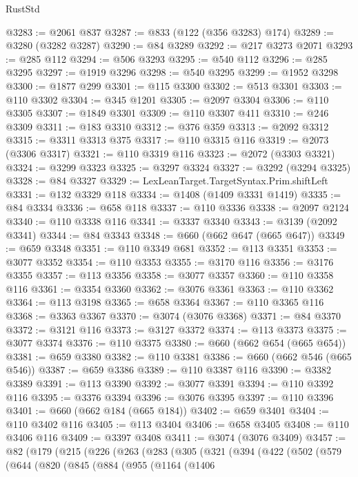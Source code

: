 \begin{lexlean}{RustStd}
\begin{coremodule}
@3283 := @2061 @837
@3287 := @833 (@122 (@356 @3283) @174)
@3289 := @3280 (@3282 @3287)
@3290 := @84 @3289
@3292 := @217 @3273 @2071
@3293 := @285 @112
@3294 := @506 @3293
@3295 := @540 @112
@3296 := @285 @3295
@3297 := @1919 @3296
@3298 := @540 @3295
@3299 := @1952 @3298
@3300 := @1877 @299
@3301 := @115 @3300
@3302 := @513 @3301
@3303 := @110 @3302
@3304 := @345 @1201
@3305 := @2097 @3304
@3306 := @110 @3305
@3307 := @1849 @3301
@3309 := @110 @3307 @411
@3310 := @246 @3309
@3311 := @183 @3310
@3312 := @376 @359
@3313 := @2092 @3312
@3315 := @3311 @3313 @375
@3317 := @110 @3315 @116
@3319 := @2073 (@3306 @3317)
@3321 := @110 @3319 @116
@3323 := @2072 (@3303 @3321)
@3324 := @3299 @3323
@3325 := @3297 @3324
@3327 := @3292 (@3294 @3325)
@3328 := @84 @3327
@3329 := LexLeanTarget.TargetSyntax.Prim.shiftLeft
@3331 := @132 @3329 @118
@3334 := @1408 (@1409 @3331 @1419)
@3335 := @84 @3334
@3336 := @658 @118
@3337 := @110 @3336
@3338 := @2097 @2124
@3340 := @110 @3338 @116
@3341 := @3337 @3340
@3343 := @3139 (@2092 @3341)
@3344 := @84 @3343
@3348 := @660 (@662 @647 (@665 @647))
@3349 := @659 @3348
@3351 := @110 @3349 @681
@3352 := @113 @3351
@3353 := @3077 @3352
@3354 := @110 @3353
@3355 := @3170 @116
@3356 := @3176 @3355
@3357 := @113 @3356
@3358 := @3077 @3357
@3360 := @110 @3358 @116
@3361 := @3354 @3360
@3362 := @3076 @3361
@3363 := @110 @3362
@3364 := @113 @3198
@3365 := @658 @3364
@3367 := @110 @3365 @116
@3368 := @3363 @3367
@3370 := @3074 (@3076 @3368)
@3371 := @84 @3370
@3372 := @3121 @116
@3373 := @3127 @3372
@3374 := @113 @3373
@3375 := @3077 @3374
@3376 := @110 @3375
@3380 := @660 (@662 @654 (@665 @654))
@3381 := @659 @3380
@3382 := @110 @3381
@3386 := @660 (@662 @546 (@665 @546))
@3387 := @659 @3386
@3389 := @110 @3387 @116
@3390 := @3382 @3389
@3391 := @113 @3390
@3392 := @3077 @3391
@3394 := @110 @3392 @116
@3395 := @3376 @3394
@3396 := @3076 @3395
@3397 := @110 @3396
@3401 := @660 (@662 @184 (@665 @184))
@3402 := @659 @3401
@3404 := @110 @3402 @116
@3405 := @113 @3404
@3406 := @658 @3405
@3408 := @110 @3406 @116
@3409 := @3397 @3408
@3411 := @3074 (@3076 @3409)
@3457 := @82
    (@179
      (@215
        (@226
          (@263
            (@283
              (@305
                (@321
                  (@394
                    (@422
                      (@502
                        (@579
                          (@644
                            (@820
                              (@845
                                (@884
                                  (@955
                                    (@1164
                                      (@1406

\end{coremodule}
\end{lexlean}
